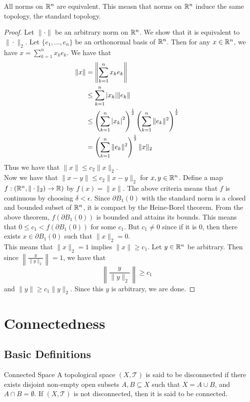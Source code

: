 \documentclass[a4paper]{article}
\begin{document}
\begin{thm}{}{} All norms on $\mathbb{R}^n$ are equivalent. This measn that norms on $\mathbb{R}^n$ induce the same topology, the standard topology. 
\begin{proof}
Let $\|\cdot\|$ be an arbitrary norm on $\mathbb{R}^n$. We show that it is equivalent to $\|\cdot\|_2$. Let $\{e_1,\dots,e_n\}$ be an orthonormal basis of $\mathbb{R}^n$. Then for any $x\in\mathbb{R}^n$, we have $x=\sum_{k=1}^nx_ke_k$. We have that 
\begin{align*}
\|x\|&=\left\|\sum_{k=1}^nx_ke_k\right\|\\
&\leq\sum_{k=1}^n\abs{x_k}\|e_k\|\\
&\leq\left(\sum_{k=1}^n\abs{x_k}^2\right)^{\frac{1}{2}}\left(\sum_{k=1}^n\|e_k\|^2\right)^{\frac{1}{2}}\\
&=\left(\sum_{k=1}^n\|e_k\|^2\right)^{\frac{1}{2}}\|x\|_2
\end{align*}
Thus we have that $\|x\|\leq c_2\|x\|_2$. \\
Now we have that $\|x-y\|\leq c_2\|x-y\|_2$ for $x,y\in\mathbb{R}^n$. Define a map $f:(\mathbb{R}^n,\|\cdot\|_2)\to\mathbb{R})$ by $f(x)=\|x\|$. The above criteria means that $f$ is continuous by choosing $\delta<\epsilon$. Since $\partial B_1(0)$ with the standard norm is a closed and bounded subset of $\mathbb{R}^n$, it is compact by the Heine-Borel theorem. From the above theorem, $f(\partial B_1(0))$ is bounded and attains its bounds. This means that $0\leq c_1<f(\partial B_1(0))$ for some $c_1$. But $c_1\neq 0$ since if it is $0$, then there exists $x\in\partial B_1(0)$ such that $\|x\|_2=0$. \\
This means that $\|x\|_2=1$ implies $\|x\|\geq c_1$. Let $y\in\mathbb{R}^n$ be arbitrary. Then since $\left\|\frac{y}{\|y\|_2}\right\|=1$, we have that $$\left\|\frac{y}{\|y\|_2}\right\|\geq c_1$$ and $\|y\|\geq c_1\|y\|_2$. Since this $y$ is arbitrary, we are done. 
\end{proof}
\end{thm}

\pagebreak
\section{Connectedness}
\subsection{Basic Definitions}
\begin{defn}{Connected Space}{} A topological space $(X,\mathcal{T})$ is said to be disconnected if there exists disjoint non-empty open subsets $A,B\subseteq X$ such that $X=A\cup B$, and $A\cap B=\emptyset$. If $(X,\mathcal{T})$ is not disconnected, then it is said to be connected. 
\end{defn}
\end{document}
